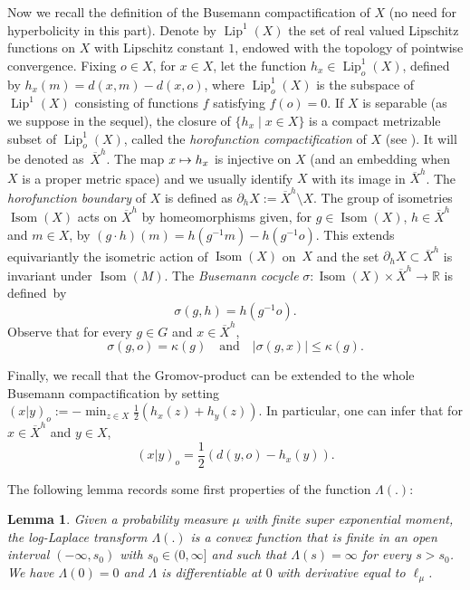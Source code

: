 \documentclass[10pt]{amsart}
\newcommand\mto{\mathchoice{\longmapsto}{\mapsto}{\mapsto}{\mapsto}}
\let\sep\mid
\newcommand{\qand}{\quad\text{and}\quad}
\theoremstyle{plain}
\newtheorem{lemma}[theorem]{Lemma}
\theoremstyle{definition}
\DeclareMathOperator\Isom{Isom}
\DeclareMathOperator\Lip{Lip}
\begin{document}
Now we recall the definition of the Busemann compactification of $X$ (no need for hyperbolicity in this part). Denote by $\Lip^1(X)$ the set of real valued Lipschitz functions on $X$ with Lipschitz constant $1$, endowed with the topology of pointwise convergence. Fixing $o \in X$, for $x \in X$, let the function $h_x \in \Lip_{o}^1(X)$, defined by $h_x(m)=d(x,m)-d(x,o)$, where $\Lip_{o}^1(X)$ is the subspace of $\Lip^1(X)$ consisting of functions $f$ satisfying $f(o)=0$. If $X$ is separable (as we suppose in the sequel), the closure of $\{h_x \sep x \in X\}$ is a compact metrizable subset of $\Lip^1_o(X)$, called the \textit{horofunction compactification} of $X$ (see \eg \cite[Prop.\,3.1]{maher-tiozzo}). It will be denoted as~$\overline{X}^h$. The map $x \mto h_x$ is injective on $X$ (and an embedding when $X$ is a proper metric space) and we usually identify $X$ with its image in $\overline{X}^h$. The \textit{horofunction boundary} of $X$ is defined as $\partial_h X:=\overline{X}^h\setminus X$. The group of isometries $\Isom(X)$ acts on $\overline{X}^h$ by homeomorphisms given, for $g \in \Isom(X)$, $h \in \overline{X}^h$ and $m \in X$, by $(g\cdot h)(m)=h(g^{-1}m)-h(g^{-1}o)$. This extends equivariantly the isometric action of $\Isom(X)$ on~$X$ and the set $\partial_h X \subset \overline{X}^h$ is invariant under $\Isom(M)$. The \textit{Busemann cocycle} \hbox{$\sigma: \Isom(X) \times \overline{X}^h \to \mathbb{R}$} is defined~by\vspace*{-3pt}
\[
\sigma(g,h)=h(g^{-1}o).
\]
Observe that for every $g\in G$ and $x\in \overline{X}^h$,\vspace*{-3pt}
\begin{equation}\label{useful}\sigma(g,o)=\kappa(g)\qand |\sigma(g,x)|\leq \kappa(g).
\end{equation}

Finally, we recall that the Gromov-product can be extended to the whole Busemann compactification by setting $(x|y)_o:=-\min_{z\in X}{\frac{1}{2}(h_x(z)+h_y(z))}$. In particular, one can infer that for $x\in \overline{X}^h$ and\vspace*{-3pt}
$y\in X$, \begin{equation}\label{gromov.extended.space.boundary}(x|y)_o=\frac{1}{2} (d(y,o)-h_x(y)).\end{equation}

\iffalse
The following lemma records some first properties of the function $\Lambda(.)$:
\begin{lemma}
Given a probability measure $\mu$ with finite super exponential moment, the log-Laplace transform $\Lambda(.)$ is a convex function that is finite in an open interval $(-\infty,s_0)$ with $s_0 \in (0,\infty] $ and such that $\Lambda(s)=\infty$ for every $s>s_0$. We have $\Lambda(0)=0$ and $\Lambda$ is differentiable at $0$ with derivative equal to $\ell_{\mu}$.
\end{lemma}
\end{document}
